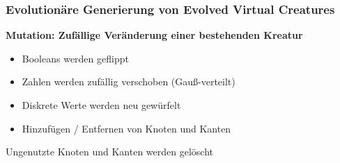 \documentclass{beamer}
\begin{document}
\begin{frame}
	\frametitle{Evolutionäre Generierung von Evolved Virtual Creatures}
	
	\textbf{Mutation: Zufällige Veränderung einer bestehenden Kreatur}
	\vspace{1em}
	\begin{itemize}
		\item Booleans werden geflippt
		\item Zahlen werden zufällig verschoben (Gauß-verteilt)
		\item Diskrete Werte werden neu gewürfelt
		\item Hinzufügen / Entfernen von Knoten und Kanten
	\end{itemize}
	\vspace{2em}
	Ungenutzte Knoten und Kanten werden gelöscht
\end{frame}
\end{document}
